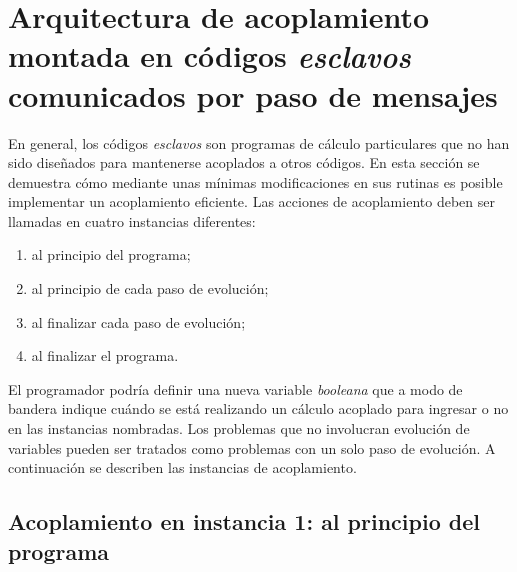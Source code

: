 \section{Arquitectura de acoplamiento montada en códigos \textit{esclavos} comunicados por paso de mensajes}
\label{2:arquitectura-mpi}

En general, los códigos \textit{esclavos} son programas de cálculo particulares que no han sido diseñados para mantenerse acoplados a otros códigos.
En esta sección se demuestra cómo mediante unas mínimas modificaciones en sus rutinas es posible implementar un acoplamiento eficiente.
Las acciones de acoplamiento deben ser llamadas en cuatro instancias diferentes:
\begin{enumerate}
\item al principio del programa;
\item al principio de cada paso de evolución;
\item al finalizar cada paso de evolución;
\item al finalizar el programa.
\end{enumerate}
El programador podría definir una nueva variable \textit{booleana} que a modo de bandera indique cuándo se está realizando un cálculo acoplado para ingresar o no en las instancias nombradas.
Los problemas que no involucran evolución de variables pueden ser tratados como problemas con un solo paso de evolución.
A continuación se describen las instancias de acoplamiento.


\subsection*{Acoplamiento en instancia 1: al principio del programa}

